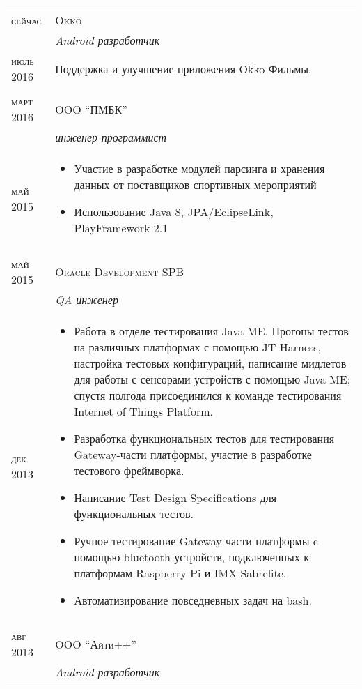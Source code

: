 \documentclass[a4paper,10pt]{article}
\begin{document}
	\begin{tabular}{l|p{12cm}}
		\multicolumn{2}{c}{} \\
			\textsc{сейчас}  & 
				\textsc{Okko}\\ &
				\emph{Android разработчик} \\
			\textsc{июль 2016}  & Поддержка и улучшение приложения Okko Фильмы.\\
		\multicolumn{2}{c}{} \\
			\textsc{март 2016} & 
				\textsc{OOO ``ПМБК''}\\ &
				\emph{инженер-программист} \\
			\textsc{май 2015} &
					\begin{itemize}
					\item Участие в разработке модулей парсинга и хранения данных от поставщиков спортивных мероприятий
					\item Использование Java 8, JPA/EclipseLink, PlayFramework 2.1					
					\end{itemize} \\
		\multicolumn{2}{c}{} \\
	  		\textsc{май 2015} & 
				\textsc{Oracle Development SPB} \\ & 
				\emph{QA инженер} \\
	  		\textsc{дек 2013} &
	  			\begin{itemize}
	  			\item Работа в отделе тестирования Java ME. Прогоны тестов на различных платформах с помощью JT Harness, настройка тестовых конфигураций, написание мидлетов для работы с сенсорами устройств с помощью Java ME; спустя полгода присоединился к команде тестирования Internet of Things Platform.
				\item Разработка функциональных тестов для тестирования Gateway-части платформы, участие в разработке тестового фреймворка.
				\item Написание Test Design Specifications для функциональных тестов.
				\item Ручное тестирование Gateway-части платформы c помощью bluetooth-устройств, подключенных к платформам Raspberry Pi и IMX Sabrelite.
				\item Автоматизирование повседневных задач на bash.
				\end{itemize} \\
	    	\multicolumn{2}{c}{} \\
			\textsc{авг 2013}  & 
				\textsc{OOO ``Айти++''}\\ &
				\emph{Android разработчик} \\

\end{tabular}
\end{document}

